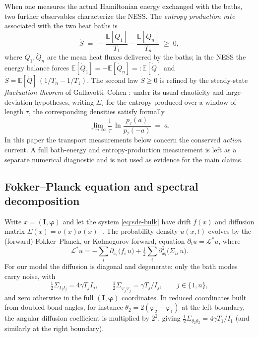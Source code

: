 \documentclass[11pt,a4paper]{article}
\theoremstyle{definition}
\newcommand{\E}{\mathbb{E}}
\numberwithin{equation}{section}   %
\newcommand{\bI}{\mathbf{I}}
\newcommand{\bphi}{\boldsymbol{\varphi}}
\newcommand{\Ladj}{\mathcal{L}^{*}}
\begin{document}
When one measures the actual Hamiltonian energy exchanged with the baths, two
further observables characterize the NESS. The \emph{entropy production rate}
associated with the two heat baths is
\begin{equation}\label{eq:entropy-prod}
  \dot S \;=\; -\frac{\E[\dot Q_1]}{T_1} - \frac{\E[\dot Q_n]}{T_n} \;\ge\; 0,
\end{equation}
where $\dot Q_1,\dot Q_n$ are the mean heat fluxes delivered by the baths; in
the NESS the energy balance forces $\E[\dot Q_1]=-\E[\dot Q_n]=:\E[\dot Q]$ and
$\dot S = \E[\dot Q]\,(1/T_n - 1/T_1)$. The second law $\dot S\ge 0$ is refined
by the steady-state \emph{fluctuation theorem} of Gallavotti--Cohen
\cite{GallavottiCohen}: under its usual chaoticity and large-deviation
hypotheses, writing $\Sigma_\tau$ for the entropy produced over a window of
length $\tau$, the corresponding densities satisfy formally
\begin{equation}\label{eq:ft}
  \lim_{\tau\to\infty}\frac{1}{\tau}\,
  \ln\frac{p_\tau(a)}{p_\tau(-a)} \;=\; a .
\end{equation}
In this paper the transport measurements below concern the conserved
\emph{action} current. A full bath-energy and entropy-production measurement is
left as a separate numerical diagnostic and is not used as evidence for the
main claims.

\subsection{Fokker--Planck equation and spectral decomposition}\label{sec:fp}

Write $x=(\bI,\bphi)$ and let the system \eqref{eq:sde-bulk} have drift $f(x)$
and diffusion matrix $\Sigma(x)=\sigma(x)\sigma(x)^{\!\top}$. The probability
density $u(x,t)$ evolves by the (forward) Fokker--Planck, or Kolmogorov forward,
equation $\partial_t u = \Ladj u$, where
\begin{equation}\label{eq:fp-operator}
  \Ladj u = -\sum_i \partial_{x_i}\!\big(f_i\,u\big)
            + \tfrac12\sum_{i} \partial^{2}_{x_i}\!\big(\Sigma_{ii}\,u\big).
\end{equation}
For our model the diffusion is diagonal and degenerate: only the bath modes
carry noise, with
\begin{equation}\label{eq:diffusion}
  \tfrac12\Sigma_{I_j I_j} = 4\gamma T_j I_j, \qquad
  \tfrac12\Sigma_{\varphi_j\varphi_j} = \gamma T_j/I_j,
  \qquad j\in\{1,n\},
\end{equation}
and zero otherwise in the full $(\bI,\bphi)$ coordinates. In reduced
coordinates built from doubled bond angles, for instance
$\theta_2=2(\varphi_2-\varphi_1)$ at the left boundary, the angular diffusion
coefficient is multiplied by $2^2$, giving
$\tfrac12\Sigma_{\theta_2\theta_2}=4\gamma T_1/I_1$ (and similarly at the right
boundary).
\end{document}
